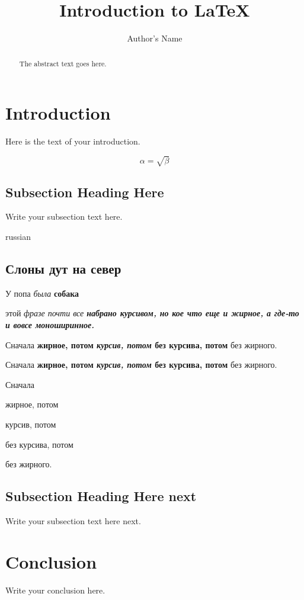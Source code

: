 \documentclass[oneside,final,14pt]{extreport}
\begin{document}
\title{Introduction to \LaTeX{}}
\author{Author's Name}

\maketitle

\begin{abstract}
The abstract text goes here.
\end{abstract}

\section{Introduction}
Here is the text of your introduction.

\begin{equation}
    \label{simple_equation}
    \alpha = \sqrt{ \beta }
\end{equation}

\subsection{Subsection Heading Here}
Write your subsection text here.

\begin{otherlanguage*}{russian}
\subsection{Слоны дут на север}
У попа {\it была} {\bf собака}

 этой \itshape фразе почти все \bfseries 
набрано курсивом, \ttfamily но кое что
\upshape еще и жирное, \rmfamily а где-то
и вовсе \mdseries моноширинное.

Сначала {\bfseries жирное, потом {\itshape курсив, потом} без курсива, потом} без жирного.

Сначала \textbf{жирное, потом \textit{курсив, потом} без курсива, потом} без жирного.

Сначала \begin{bfseries} жирное, потом 
        \begin{itshape} курсив, потом
        \end{itshape}без курсива, потом
        \end{bfseries} без жирного.


\end{otherlanguage*}

\subsection{Subsection Heading Here next}
Write your subsection text here next.

\section{Conclusion}
Write your conclusion here.
\end{document}
